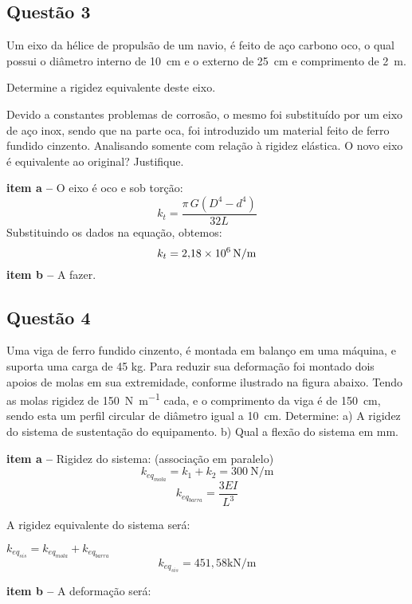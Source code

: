 \subsection{Questão 3}
Um eixo da hélice de propulsão de um navio, é feito de aço carbono oco, o qual possui o
diâmetro interno de \SI{10}{cm} e o externo de \SI{25}{cm} e comprimento de \SI{2}{m}.
\begin{enumalpha}
    \item Determine a rigidez equivalente deste eixo.
    \item Devido a constantes problemas de corrosão, o mesmo foi substituído por um eixo de aço inox, sendo que
na parte oca, foi introduzido um material feito de ferro fundido cinzento. Analisando somente com
relação à rigidez elástica. O novo eixo é equivalente ao original? Justifique.
\end{enumalpha}

\resol

\textbf{item a --} O eixo é oco e sob torção:
\begin{equation}\label{eq:rigidez_eixo_oco}
k_t=\frac{\pi\,G \left( D^{4}-d^{4} \right)  }{32L}
\end{equation}
Substituindo os dados na equação, obtemos:
\[
k_t=\SI{2,18d6}{\newton\per\meter}
\]
\textbf{item b --} A fazer.

\subsection{Questão 4}
Uma viga de ferro fundido cinzento, é montada em balanço em uma máquina, e suporta uma
carga de 45 kg. Para reduzir sua deformação foi montado dois apoios de molas em sua extremidade,
conforme ilustrado na figura abaixo. Tendo as molas rigidez de \SI{150}{\newton\per\meter} cada, e o comprimento da viga é
de \SI{150}{cm}, sendo esta um perfil circular de diâmetro igual a \SI{10}{cm}. Determine:
a) A rigidez do sistema de sustentação do equipamento.
b) Qual a flexão do sistema em mm.

\resol

\textbf{item a --} Rigidez do sistema:
(associação em paralelo)
\[
    k_{eq_{mola}}=k_1+k_2=\SI{300}{\newton\per\meter}
\]
\[
    k_{eq_{barra}}=\frac{3E I}{L^3}
\]

A rigidez equivalente do sistema será:

$k_{eq_{sis}} =k_{eq_{mola}} + k_{eq_{barra}}$
\[
    k_{eq_{sis}}=451,58\mathrm{kN/m}
\]

\textbf{item b --} A deformação será:

